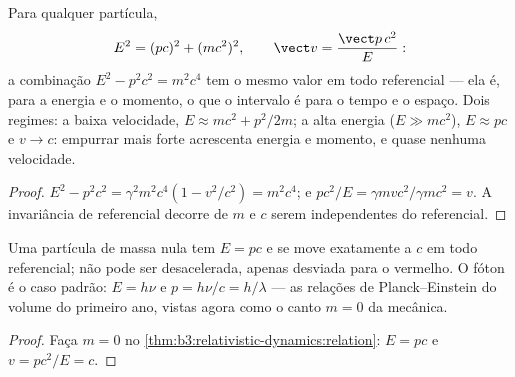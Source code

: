 \begin{theorem}\label{thm:b3:relativistic-dynamics:relation}
Para qualquer partícula,
\[
E^2 = (pc)^2 + (mc^2)^2 ,
\qquad
\vect v = \frac{\vect p\,c^2}{E} :
\]
a combinação $E^2 - p^2c^2 = m^2c^4$ tem o mesmo valor em todo
referencial --- ela é, para a energia e o momento, o que o intervalo é
para o tempo e o espaço. Dois regimes: a baixa velocidade,
$E \approx mc^2 + p^2/2m$; a alta energia ($E \gg mc^2$),
$E \approx pc$ e $v \to c$: empurrar mais forte acrescenta energia e
momento, e quase nenhuma velocidade.
\end{theorem}

\begin{proof}
$E^2 - p^2c^2 = \gamma^2m^2c^4(1 - v^2/c^2) = m^2c^4$; e $pc^2/E =
\gamma mvc^2/\gamma mc^2 = v$. A invariância de referencial decorre de
$m$ e $c$ serem independentes do referencial.
\end{proof}

\begin{proposition}\label{prop:b3:relativistic-dynamics:massless}
Uma partícula de massa nula tem $E = pc$ e se move exatamente a $c$ em
todo referencial; não pode ser desacelerada, apenas desviada para o
vermelho. O fóton é o caso padrão: $E = h\nu$ e $p = h\nu/c = h/\lambda$
--- as relações de Planck--Einstein do volume do primeiro ano, vistas
agora como o canto $m = 0$ da mecânica.
\end{proposition}

\begin{proof}
Faça $m = 0$ no \cref{thm:b3:relativistic-dynamics:relation}: $E = pc$
e $v = pc^2/E = c$.
\end{proof}


